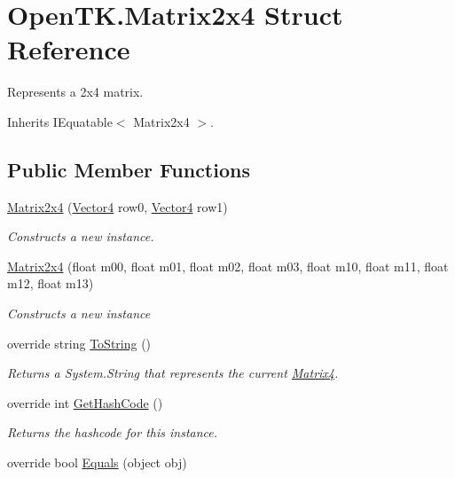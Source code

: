 \hypertarget{struct_open_t_k_1_1_matrix2x4}{\section{Open\-T\-K.\-Matrix2x4 Struct Reference}
\label{struct_open_t_k_1_1_matrix2x4}
}


Represents a 2x4 matrix.  




Inherits I\-Equatable$<$ Matrix2x4 $>$.

\subsection*{Public Member Functions}
\begin{DoxyCompactItemize}
\item 
\hyperlink{struct_open_t_k_1_1_matrix2x4_aa96d2aa45d6d784f5051e9351c774252}{Matrix2x4} (\hyperlink{struct_open_t_k_1_1_vector4}{Vector4} row0, \hyperlink{struct_open_t_k_1_1_vector4}{Vector4} row1)
\begin{DoxyCompactList}\small\item\em Constructs a new instance. \end{DoxyCompactList}\item 
\hyperlink{struct_open_t_k_1_1_matrix2x4_ae8da1028990f174d236355b1001082e2}{Matrix2x4} (float m00, float m01, float m02, float m03, float m10, float m11, float m12, float m13)
\begin{DoxyCompactList}\small\item\em Constructs a new instance \end{DoxyCompactList}\item 
override string \hyperlink{struct_open_t_k_1_1_matrix2x4_a745ebd9b49fd3eb2b0722c246ffa4f3e}{To\-String} ()
\begin{DoxyCompactList}\small\item\em Returns a System.\-String that represents the current \hyperlink{struct_open_t_k_1_1_matrix4}{Matrix4}. \end{DoxyCompactList}\item 
override int \hyperlink{struct_open_t_k_1_1_matrix2x4_a0472470f64dff1f308120171ec6f3f2b}{Get\-Hash\-Code} ()
\begin{DoxyCompactList}\small\item\em Returns the hashcode for this instance. \end{DoxyCompactList}\item 
override bool \hyperlink{struct_open_t_k_1_1_matrix2x4_a81d450d78b97da8c65f01f599517497d}{Equals} (object obj)

\end{DoxyCompactItemize}

